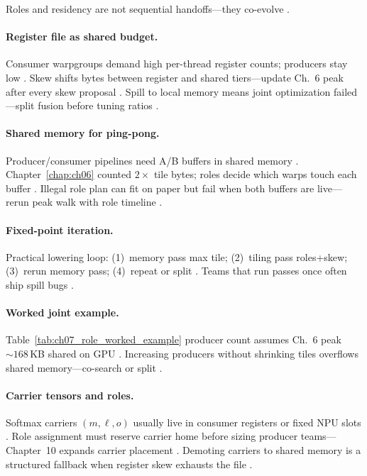 Roles and residency are not sequential handoffs---they co-evolve \citep{yirage2026,dao2022flashattention,shah2024flashattention3,chen2020compilerbasedhardw}.

\paragraph{Register file as shared budget.}
Consumer warpgroups demand high per-thread register counts; producers stay low \citep{shah2024flashattention3,nvidia2022hopper}.
Skew shifts bytes between register and shared tiers---update Ch.~6 peak after every skew proposal \citep{memoryfloor2026,yirage2026}.
Spill to local memory means joint optimization failed---split fusion before tuning ratios \citep{dao2022flashattention,chen2020compilerbasedhardw}.

\paragraph{Shared memory for ping-pong.}
Producer/consumer pipelines need A/B buffers in shared memory \citep{semianalysis2024tma,dao2022flashattention}.
Chapter~\ref{chap:ch06} counted $2\times$ tile bytes; roles decide which warps touch each buffer \citep{yirage2026,shah2024flashattention3}.
Illegal role plan can fit on paper but fail when both buffers are live---rerun peak walk with role timeline \citep{wu2024mirage,memoryfloor2026}.

\paragraph{Fixed-point iteration.}
Practical lowering loop: (1)~memory pass max tile; (2)~tiling pass roles+skew; (3)~rerun memory pass; (4)~repeat or split \citep{yirage2026,wu2024mirage,mpk2025,chen2020compilerbasedhardw}.
Teams that run passes once often ship spill bugs \citep{memoryfloor2026,taxbreak2026,patel2025llminference}.

\paragraph{Worked joint example.}
Table~\ref{tab:ch07_role_worked_example} producer count assumes Ch.~6 peak ${\sim}168$\,KB shared on GPU \citep{yirage2026,dao2022flashattention,taxbreak2026}.
Increasing producers without shrinking tiles overflows shared memory---co-search or split \citep{memoryfloor2026,nvidia2022hopper,shah2024flashattention3}.

\paragraph{Carrier tensors and roles.}
Softmax carriers $(m,\ell,o)$ usually live in consumer registers or fixed NPU slots \citep{dao2022flashattention,amd2024aie,shah2024flashattention3}.
Role assignment must reserve carrier home before sizing producer teams---Chapter~10 expands carrier placement \citep{dao2022flashattention,patel2025llminference,yirage2026}.
Demoting carriers to shared memory is a structured fallback when register skew exhausts the file \citep{memoryfloor2026,nvidia2022hopper}.

